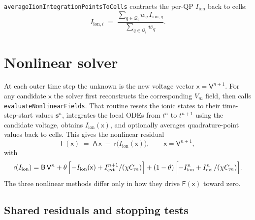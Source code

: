 \documentclass[11pt,a4paper]{article}
\newcommand{\Vm}{V_{m}}
\newcommand{\Iion}{I_{\text{ion}}}
\newcommand{\Iionsub}[1]{I_{\text{ion},#1}}
\newcommand{\Iext}{I_{\text{ext}}}
\newcommand{\Aimp}{\mathsf{A}}
\newcommand{\Bimp}{\mathsf{B}}
\newcommand{\code}[1]{\texttt{\small #1}}
\begin{document}
\code{averageIionIntegrationPointsToCells} contracts the per-QP $\Iion$
back to cells:
\begin{equation}
  \Iionsub{i} \;=\;
   \frac{\sum_{q \in \mathcal{Q}_{i}} w_{q}\, \Iionsub{q}}
        {\sum_{q \in \mathcal{Q}_{i}} w_{q}}.
\end{equation}

\section{Nonlinear solver}

At each outer time step the unknown is the new voltage vector
$\mathsf{x}=\mathsf{V}^{n+1}$. For any candidate $\mathsf{x}$ the solver
first reconstructs the corresponding $\Vm$ field, then calls
\code{evaluateNonlinearFields}. That routine resets the ionic states to
their time-step-start values $\mathbf{s}^{n}$, integrates the local ODEs
from $t^n$ to $t^{n+1}$ using the candidate voltage, obtains
$\Iion(\mathsf{x})$, and optionally averages quadrature-point values
back to cells. This gives the nonlinear residual
\begin{equation}
  \mathsf{F}(\mathsf{x})
   \;=\;
   \Aimp\, \mathsf{x}
   \;-\;
   \mathsf{r}\!\bigl( \Iion(\mathsf{x}) \bigr),
   \qquad
   \mathsf{x} = \mathsf{V}^{n+1},
   \label{eq:Fdef}
\end{equation}
with
\begin{equation}
  \mathsf{r}(\Iion)
  =
  \Bimp\,\mathsf{V}^{n}
  + \theta\,\Bigl[-\Iion(\mathsf{x})+\Iext^{n+1}/(\chi C_m)\Bigr]
  + (1-\theta)\,\Bigl[-\Iion^{n}+\Iext^{n}/(\chi C_m)\Bigr].
  \label{eq:rhsIion}
\end{equation}
The three nonlinear methods differ only in how they drive
$\mathsf{F}(\mathsf{x})$ toward zero.

\subsection{Shared residuals and stopping tests}
\end{document}
